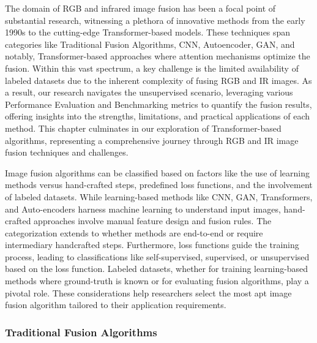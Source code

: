 \label{chp:RelatedWork}

The domain of RGB and infrared image fusion has been a focal point of substantial research, witnessing a plethora of innovative methods from the early 1990s to the cutting-edge Transformer-based models. These techniques span categories like Traditional Fusion Algorithms, CNN, Autoencoder, GAN, and notably, Transformer-based approaches where attention mechanisms optimize the fusion. Within this vast spectrum, a key challenge is the limited availability of labeled datasets due to the inherent complexity of fusing RGB and IR images. As a result, our research navigates the unsupervised scenario, leveraging various Performance Evaluation and Benchmarking metrics to quantify the fusion results, offering insights into the strengths, limitations, and practical applications of each method. This chapter culminates in our exploration of Transformer-based algorithms, representing a comprehensive journey through RGB and IR image fusion techniques and challenges.

Image fusion algorithms can be classified based on factors like the use of learning methods versus hand-crafted steps, predefined loss functions, and the involvement of labeled datasets. While learning-based methods like CNN, GAN, Transformers, and Auto-encoders harness machine learning to understand input images, hand-crafted approaches involve manual feature design and fusion rules. The categorization extends to whether methods are end-to-end or require intermediary handcrafted steps. Furthermore, loss functions guide the training process, leading to classifications like self-supervised, supervised, or unsupervised based on the loss function. Labeled datasets, whether for training learning-based methods where ground-truth is known or for evaluating fusion algorithms, play a pivotal role. These considerations help researchers select the most apt image fusion algorithm tailored to their application requirements.

\subsubsection{Traditional Fusion Algorithms}
\label{sec:traditional}

